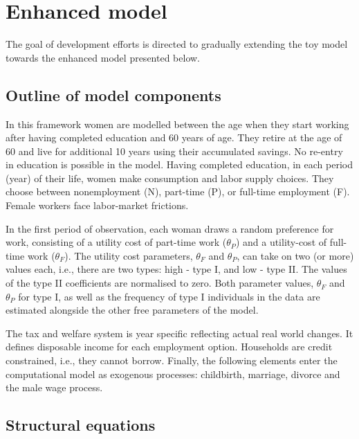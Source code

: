 \documentclass[letterpaper,10pt,english]{sphinxmanual}
\begin{document}
\section{Enhanced model}
\label{\detokenize{computational_model:enhanced-model}}
The goal of development efforts is directed to gradually extending the toy model towards the enhanced model presented below.


\subsection{Outline of model components}
\label{\detokenize{computational_model:outline-of-model-components}}
In this framework women are modelled between the age when they start working after having completed education and 60 years of age. They retire at the age of 60 and live for additional 10 years using their accumulated savings. No re-entry in education is possible in the model. Having completed education, in each period (year) of their life, women make consumption and labor supply choices. They choose between nonemployment (N), part-time (P), or full-time employment (F). Female workers face labor-market frictions.

In the first period of observation, each woman draws a random preference for work, consisting of a utility cost of part-time work (\(\theta_P\)) and a utility-cost of full-time work (\(\theta_F\)). The utility cost parameters,  \(\theta_F\) and \(\theta_P\), can take on two (or more) values each, i.e., there are two types: high - type I, and low - type II. The values of the type II coefficients are normalised to zero. Both parameter values, \(\theta_F\) and \(\theta_P\) for type I, as well as the frequency of type I individuals in the data are estimated alongside the other free parameters of the model.

The tax and welfare system is year specific reflecting actual real world changes. It defines disposable income for each employment option. Households are credit constrained, i.e., they cannot borrow. Finally, the following elements enter the computational model as exogenous processes: childbirth, marriage, divorce and the male wage process.


\subsection{Structural equations}
\label{\detokenize{computational_model:id1}}
\end{document}
